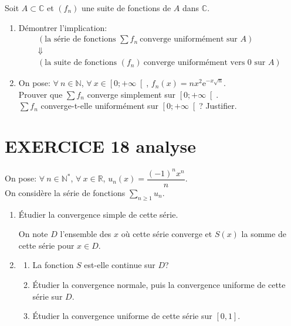 \documentclass[10pt,oneside]{article}
\begin{document}
\begin{flushleft}
Soit $A\subset \mathbb{C}$ et $\left( f_{n}\right)$ une suite de fonctions de $A$ dans $\mathbb{C}$.

\begin{enumerate}
\item D\'{e}montrer l'implication:
	\begin{eqnarray*}
	& \left( \text{la s\'{e}rie de fonctions }\displaystyle\sum f_{n}\ \text{converge uniform\'{e}ment sur $A$}\right)& \\
	&\Downarrow &\\
	&\left( \text{la suite de fonctions\ }\left( f_{n}\right)\ \text{converge uniform\'{e}ment vers 0 sur $A$}\right)&
	\end{eqnarray*}
\item
On pose: $\forall\:n\in\mathbb{N}$, $\forall\:x\in\left[ 0;+\infty\right[ $, $f_n(x)=nx^2\mathrm{e}^{-x\sqrt{n}}$.\\
Prouver que $\displaystyle\sum f_n$ converge simplement sur $\left[ 0;+\infty\right[$.\\
$\displaystyle\sum f_n$ converge-t-elle uniformément sur $\left[ 0;+\infty\right[$? Justifier.
\end{enumerate}

\section*{EXERCICE 18 \:analyse }

On pose: $\forall\:n\in\mathbb{N}^*$, $\forall\:x\in\mathbb{R}$, $u_n (x) =\dfrac{ ( - 1)^n x^n } { n}$.\\ 
On considère la série de fonctions $\displaystyle\sum\limits_{n\geqslant1}^{}u_n$.
\begin{enumerate}
\item \'Etudier la convergence simple de cette série.


On note $D$ l'ensemble des $x$ où cette série converge et $S(x)$ la somme de cette série pour $x\in D$. 

\item \begin{enumerate}
	\item La fonction $S$ est-elle continue sur $D$? 

	\item \'Etudier la convergence normale, puis la convergence uniforme de cette série sur $D$. \\

\item
 \'Etudier la convergence uniforme de cette série sur $\left[ 0,1\right] $.
	\end{enumerate}
\end{enumerate}


\end{flushleft}
\end{document}
